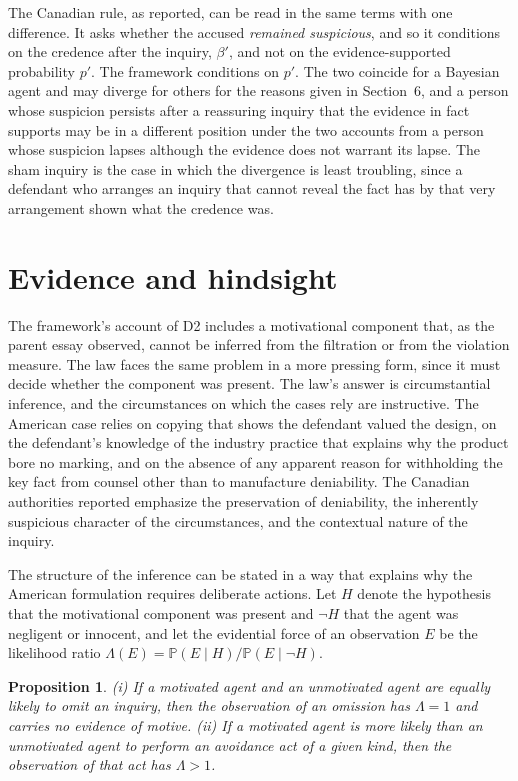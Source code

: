 \documentclass[11pt]{article}
\newcommand{\PP}{\mathbb P}
\theoremstyle{plain}
\newtheorem{proposition}{Proposition}
\theoremstyle{definition}
\begin{document}
The Canadian rule, as reported, can be read in the same terms with one difference. It asks whether the accused \emph{remained suspicious}, and so it conditions on the credence after the inquiry, $\beta'$, and not on the evidence-supported probability $p'$. The framework conditions on $p'$. The two coincide for a Bayesian agent and may diverge for others for the reasons given in Section~6, and a person whose suspicion persists after a reassuring inquiry that the evidence in fact supports may be in a different position under the two accounts from a person whose suspicion lapses although the evidence does not warrant its lapse. The sham inquiry is the case in which the divergence is least troubling, since a defendant who arranges an inquiry that cannot reveal the fact has by that very arrangement shown what the credence was.

\section{Evidence and hindsight}

The framework's account of D2 includes a motivational component that, as the parent essay observed, cannot be inferred from the filtration or from the violation measure. The law faces the same problem in a more pressing form, since it must decide whether the component was present. The law's answer is circumstantial inference, and the circumstances on which the cases rely are instructive. The American case relies on copying that shows the defendant valued the design, on the defendant's knowledge of the industry practice that explains why the product bore no marking, and on the absence of any apparent reason for withholding the key fact from counsel other than to manufacture deniability. The Canadian authorities reported emphasize the preservation of deniability, the inherently suspicious character of the circumstances, and the contextual nature of the inquiry.

The structure of the inference can be stated in a way that explains why the American formulation requires deliberate actions. Let $H$ denote the hypothesis that the motivational component was present and $\neg H$ that the agent was negligent or innocent, and let the evidential force of an observation $E$ be the likelihood ratio $\Lambda(E)=\PP(E\mid H)/\PP(E\mid\neg H)$.

\begin{proposition}\label{prop:evidence}
(i) If a motivated agent and an unmotivated agent are equally likely to omit an inquiry, then the observation of an omission has $\Lambda=1$ and carries no evidence of motive. (ii) If a motivated agent is more likely than an unmotivated agent to perform an avoidance act of a given kind, then the observation of that act has $\Lambda>1$.
\end{proposition}
\end{document}
